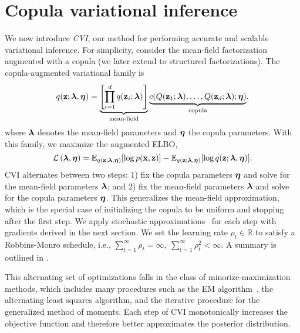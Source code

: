 \section{Copula variational inference}
\label{sec:copula}

We now introduce \emph{\gls{CVI}}, our method for
performing accurate and scalable variational inference. For
simplicity, consider the mean-field factorization augmented with a
copula (we later extend to structured factorizations). The copula-augmented variational family is
\begin{equation}
q(\boldsymbol{\mathbf{z}};\boldsymbol{\mathbf{\lambda}},\boldsymbol{\mathbf{\eta}}) = \underbrace{\left[\prod_{i=1}^d
q(\boldsymbol{\mathbf{z}}_i;\boldsymbol{\mathbf{\lambda}})\right]}_{\text{mean-field}}
\underbrace{c(Q(\boldsymbol{\mathbf{z}}_1;\boldsymbol{\mathbf{\lambda}}),\ldots,Q(\boldsymbol{\mathbf{z}}_d;\boldsymbol{\mathbf{\lambda}});
\boldsymbol{\mathbf{\eta}})}_{\text{copula}},
\label{eq:copula_variational}
\end{equation}
where $\boldsymbol{\mathbf{\lambda}}$ denotes the mean-field parameters and $\boldsymbol{\mathbf{\eta}}$ the
copula parameters. With this family, we maximize the augmented \gls{ELBO},
\begin{equation*}
  \mathcal{L}\left(\boldsymbol{\mathbf{\lambda}},\boldsymbol{\mathbf{\eta}}\right)
  = \mathbb{E}_{q(\boldsymbol{\mathbf{z}};\boldsymbol{\mathbf{\lambda}},\boldsymbol{\mathbf{\eta}})}[\log p(\boldsymbol{\mathbf{x}},\boldsymbol{\mathbf{z}})] - \mathbb{E}_{q(\boldsymbol{\mathbf{z}};\boldsymbol{\mathbf{\lambda}},\boldsymbol{\mathbf{\eta}})}[\log
  q(\boldsymbol{\mathbf{z}};\boldsymbol{\mathbf{\lambda}},\boldsymbol{\mathbf{\eta}})].
\end{equation*}
\Gls{CVI} alternates between two steps: 1) fix the copula parameters
$\boldsymbol{\mathbf{\eta}}$ and solve for the mean-field parameters $\boldsymbol{\mathbf{\lambda}}$; and 2)
fix the mean-field parameters $\boldsymbol{\mathbf{\lambda}}$ and solve for the copula
parameters $\boldsymbol{\mathbf{\eta}}$. This generalizes the mean-field approximation,
which is the special case of initializing the copula to be uniform and
stopping after the first step. We apply stochastic approximations~\citep{robbins1951stochastic} for each step with
gradients derived in the next section. We set the learning rate
$\rho_t\in\mathbb{R}$ to satisfy a Robbins-Monro
schedule, i.e.,
$\sum_{t=1}^\infty\rho_t=\infty,~\sum_{t=1}^\infty\rho_t^2<\infty$.
A summary is outlined in .

This alternating set of optimizations falls in the class of
minorize-maximization methods, which includes many procedures such as
the EM algorithm~\citep{dempster1777maximum}, the alternating least
squares algorithm, and the iterative procedure for the generalized
method of moments.
Each step of \gls{CVI}
monotonically increases the objective function and therefore better
approximates the posterior distribution.

